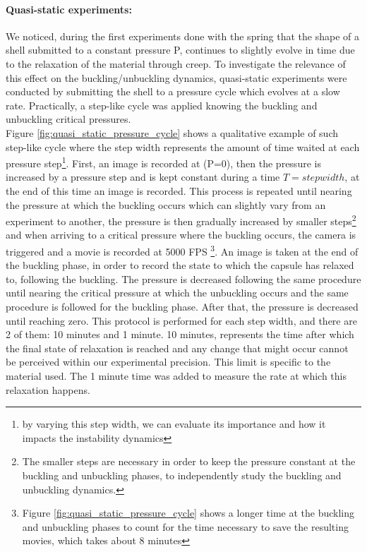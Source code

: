 \paragraph{Quasi-static experiments:}
We noticed, during the first experiments done with the spring that the shape of a shell submitted to a constant pressure P, continues to slightly evolve in time due to the relaxation of the material through creep. To investigate the relevance of this effect on the buckling/unbuckling dynamics, quasi-static experiments were conducted by submitting the shell to a pressure cycle which evolves at a slow rate. Practically, a step-like cycle was applied knowing the buckling and unbuckling critical pressures.\\
Figure \ref{fig:quasi_static_pressure_cycle} shows a qualitative example of such step-like cycle where the step width represents the amount of time waited at each pressure step\footnote{by varying this step width, we can evaluate its importance and how it impacts the instability dynamics}.
First, an image is recorded at (P=0), then the pressure is increased by a pressure step and is kept constant during a time $T=step width$, at the end of this time an image is recorded. This process is repeated until nearing the pressure at which the buckling occurs which can slightly vary from an experiment to another, the pressure is then gradually increased by smaller steps\footnote{The smaller steps are necessary in order to keep the pressure constant at the buckling and unbuckling phases, to independently study the buckling and unbuckling dynamics.}
 and when arriving to a critical pressure where the buckling occurs, the camera is triggered and a movie is recorded at 5000 FPS \footnote{Figure \ref{fig:quasi_static_pressure_cycle} shows a longer time at the buckling and unbuckling phases to count for the time necessary to save the resulting movies, which takes about 8 minutes}. An image is taken at the end of the buckling phase, in order to record the state to which the capsule has relaxed to, following the buckling.
The pressure is decreased following the same procedure until nearing the critical pressure at which the unbuckling occurs and the same procedure is followed for the buckling phase. After that, the pressure is decreased until reaching zero.
This protocol is performed for each step width, and there are 2 of them: 10 minutes and 1 minute. 10 minutes, represents the time after which the final state of relaxation is reached and any change that might occur cannot be perceived within our experimental precision. This limit is specific to the material used. The 1 minute time was added to measure the rate at which this relaxation happens.\\
   
